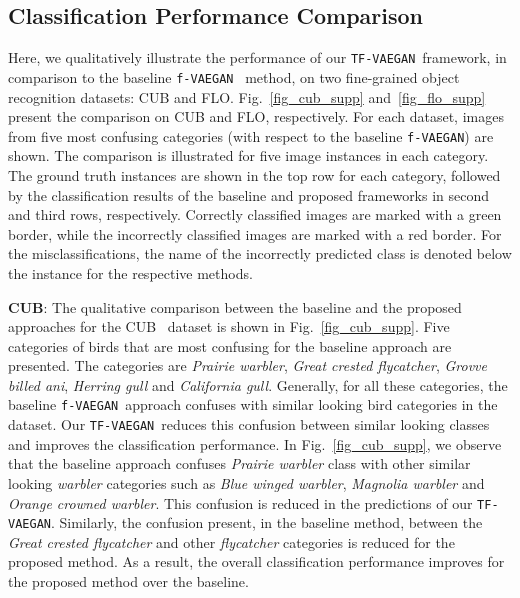 \documentclass[runningheads]{llncs}
\newcommand{\vaegan}{\texttt{f-VAEGAN}}
\newcommand{\proposed}{\texttt{TF-VAEGAN}}
\begin{document}
\clearpage



\subsection{Classification Performance Comparison\label{sec_cls_perf}}
Here, we qualitatively illustrate the performance of our \proposed~framework, in comparison to the baseline \vaegan~\cite{Xian19cvpr} method, on two fine-grained object recognition datasets: CUB and FLO. Fig.~\ref{fig_cub_supp} and~\ref{fig_flo_supp} present the comparison on CUB and FLO, respectively. For each dataset, images from five most confusing categories (with respect to the baseline \vaegan) are shown. The comparison is illustrated for five image instances in each category. The ground truth instances are shown in the top row for each category, followed by the classification results of the baseline and proposed frameworks in second and third rows, respectively. Correctly classified images are marked with a green border, while the incorrectly classified images are marked with a red border. For the misclassifications, the name of the incorrectly predicted class is denoted below the instance for the respective methods. 

\noindent\textbf{CUB}: The qualitative comparison between the baseline and the proposed approaches for the CUB~\cite{cub} dataset is shown in Fig.~\ref{fig_cub_supp}. Five categories of birds that are most confusing for the baseline approach are presented. The categories are \textit{Prairie warbler}, \textit{Great crested flycatcher}, \textit{Grovve billed ani}, \textit{Herring gull} and \textit{California gull}. Generally, for all these categories, the baseline \vaegan~approach confuses with similar looking bird categories in the dataset. Our \proposed~reduces this confusion between similar looking classes and improves the classification performance. In Fig.~\ref{fig_cub_supp}, we observe that the baseline approach confuses \textit{Prairie warbler} class with other similar looking \textit{warbler} categories such as \textit{Blue winged warbler}, \textit{Magnolia warbler} and \textit{Orange crowned warbler}. This confusion is reduced in the predictions of our \proposed. Similarly, the confusion present, in the baseline method, between the \textit{Great crested flycatcher} and other \textit{flycatcher} categories is reduced for the proposed method. As a result, the overall classification performance improves for the proposed method over the baseline. 
\end{document}

